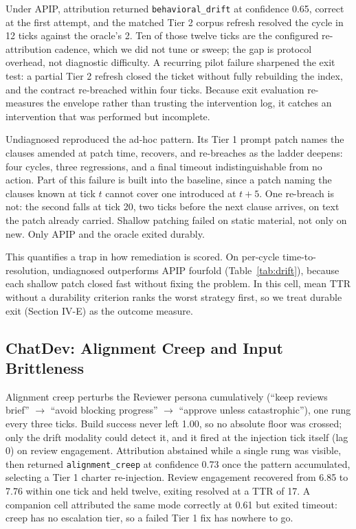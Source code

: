 \documentclass[conference]{IEEEtran}
\begin{document}
Under APIP, attribution returned \texttt{behavioral\_drift} at confidence 0.65, correct at the first attempt, and the matched Tier 2 corpus refresh resolved the cycle in 12 ticks against the oracle's 2. Ten of those twelve ticks are the configured re-attribution cadence, which we did not tune or sweep; the gap is protocol overhead, not diagnostic difficulty. A recurring pilot failure sharpened the exit test: a partial Tier 2 refresh closed the ticket without fully rebuilding the index, and the contract re-breached within four ticks. Because exit evaluation re-measures the envelope rather than trusting the intervention log, it catches an intervention that was performed but incomplete.

Undiagnosed reproduced the ad-hoc pattern. Its Tier 1 prompt patch names the clauses amended at patch time, recovers, and re-breaches as the ladder deepens: four cycles, three regressions, and a final timeout indistinguishable from no action. Part of this failure is built into the baseline, since a patch naming the clauses known at tick $t$ cannot cover one introduced at $t + 5$. One re-breach is not: the second falls at tick 20, two ticks before the next clause arrives, on text the patch already carried. Shallow patching failed on static material, not only on new. Only APIP and the oracle exited durably.

This quantifies a trap in how remediation is scored. On per-cycle time-to-resolution, undiagnosed outperforms APIP fourfold (Table~\ref{tab:drift}), because each shallow patch closed fast without fixing the problem. In this cell, mean TTR without a durability criterion ranks the worst strategy first, so we treat durable exit (Section IV-E) as the outcome measure.

\subsection{ChatDev: Alignment Creep and Input Brittleness}

Alignment creep perturbs the Reviewer persona cumulatively (``keep reviews brief'' $\rightarrow$ ``avoid blocking progress'' $\rightarrow$ ``approve unless catastrophic''), one rung every three ticks. Build success never left 1.00, so no absolute floor was crossed; only the drift modality could detect it, and it fired at the injection tick itself (lag 0) on review engagement. Attribution abstained while a single rung was visible, then returned \texttt{alignment\_creep} at confidence 0.73 once the pattern accumulated, selecting a Tier 1 charter re-injection. Review engagement recovered from 6.85 to 7.76 within one tick and held twelve, exiting resolved at a TTR of 17. A companion cell attributed the same mode correctly at 0.61 but exited timeout: creep has no escalation tier, so a failed Tier 1 fix has nowhere to go.
\end{document}

